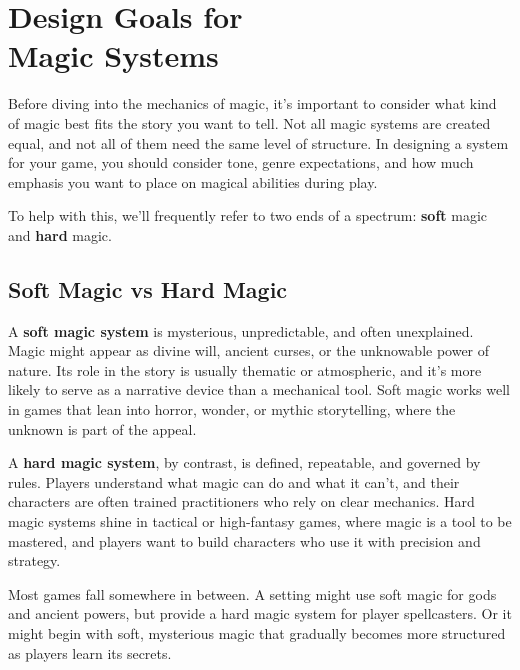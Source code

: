 \section[Design Goals for Magic Systems]{Design Goals for\\Magic Systems}

Before diving into the mechanics of magic, it's important to consider what kind of magic best fits the story you want to tell. Not all magic systems are created equal, and not all of them need the same level of structure. In designing a system for your game, you should consider tone, genre expectations, and how much emphasis you want to place on magical abilities during play.

To help with this, we’ll frequently refer to two ends of a spectrum: \textbf{soft} magic and \textbf{hard} magic.

\subsection{Soft Magic vs Hard Magic}

A \textbf{soft magic system} is mysterious, unpredictable, and often unexplained. Magic might appear as divine will, ancient curses, or the unknowable power of nature. Its role in the story is usually thematic or atmospheric, and it's more likely to serve as a narrative device than a mechanical tool. Soft magic works well in games that lean into horror, wonder, or mythic storytelling, where the unknown is part of the appeal.

A \textbf{hard magic system}, by contrast, is defined, repeatable, and governed by rules. Players understand what magic can do and what it can’t, and their characters are often trained practitioners who rely on clear mechanics. Hard magic systems shine in tactical or high-fantasy games, where magic is a tool to be mastered, and players want to build characters who use it with precision and strategy.

Most games fall somewhere in between. A setting might use soft magic for gods and ancient powers, but provide a hard magic system for player spellcasters. Or it might begin with soft, mysterious magic that gradually becomes more structured as players learn its secrets.

